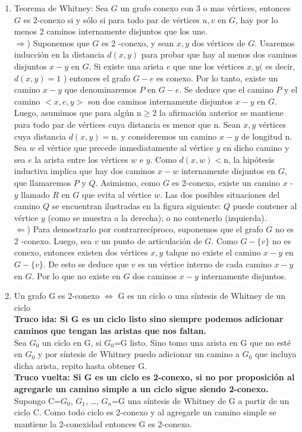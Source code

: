 \documentclass{article}
\begin{document}
\begin{enumerate}
    \item Teorema de Whitney: Sea $G$ un grafo conexo con 3 o mas vértices, entonces $G$ es 2-conexo si y sólo si para todo par de vértices $u, v$ en $G$, hay por lo menos 2 caminos internamente disjuntos que los une. \\
    $\Longrightarrow$) Suponemos que $G$ es 2 -conexo, y sean $x, y$ dos vértices de $G$. Usaremos inducción en la distancia $d(x, y)$ para probar que hay al menos dos caminos disjuntos $x-y$ en $G$. Si existe una arista $e$ que une los vértices $x, y($ es decir, $d(x, y)=1$ ) entonces el grafo $G-e$ es conexo. Por lo tanto, existe un camino $x-y$ que denominaremos $P$ en $G-e$. Se deduce que el camino $P$ y el camino $<x, e, y>$ son dos caminos internamente disjuntos $x-y$ en $G$. \\
    Luego, asumimos que para algún $\mathrm{n} \geq 2$ la afirmación anterior se mantiene para todo par de vértices cuya distancia es menor que $\mathrm{n}$. Sean $x, y$ vértices cuya distancia $d(x, y)=\mathrm{n}$, y consideremos un camino $x-y$ de longitud $\mathrm{n}$. Sea $w$ el vértice que precede inmediatamente al vértice $y$ en dicho camino y sea $e$ la arista entre los vértices $w$ e $y$. Como $d(x, w)<\mathrm{n}$, la hipótesis inductiva implica que hay dos caminos $x-w$ internamente disjuntos en $G$, que llamaremos $P$ y $Q$. Asimismo, como $G$ es 2-conexo, existe un camino $x$ - $y$ llamado $R$ en $G$ que evita al vértice $w$. Las dos posibles situaciones del camino $Q$ se encuentran ilustradas en la figura siguiente: $Q$ puede contener al vértice $y$ (como se muestra a la derecha); o no contenerlo (izquierda). \\
    $\Longleftarrow$) Para demostrarlo por contrarrecíproco, suponemos que el grafo $G$ no es 2 -conexo. Luego, sea $v$ un punto de articulación de $G .$ Como $G-\{v\}$ no es conexo, entonces existen dos vértices $x, y$ talque no existe el camino $x-y$ en $G-\{v\} .$ De esto se deduce que $v$ es un vértice interno de cada camino $x-y$ en $G$. Por lo que no existe en $G$ dos caminos $x-y$ internamente disjuntos. 
    
    \item Un grafo G es 2-conexo $\iff$ G es un ciclo o una síntesis de Whitney de un ciclo \\
    \textbf{Truco ida: Si G es un ciclo listo sino siempre podemos adicionar caminos que tengan las aristas que nos faltan.} \\
    Sea $G_0$ un ciclo en G, si $G_0$=G listo. Sino tomo una arista en G que no esté en $G_0$ y por síntesis de Whitney puedo adicionar un camino a $G_0$ que incluya dicha arista, repito hasta obtener G. \\
    \textbf{Truco vuelta: Si G es un ciclo es 2-conexo, si no por proposición al agregarle un camino simple a un ciclo sigue siendo 2-conexo.} \\
    Supongo C=$G_0$, $G_1$, …, $G_n$=G una síntesis de Whitney de G a partir de un ciclo C. Como todo ciclo es 2-conexo y al agregarle un camino simple se mantiene la 2-conexidad entonces G es 2-conexo.
    

\end{enumerate}
\end{document}
